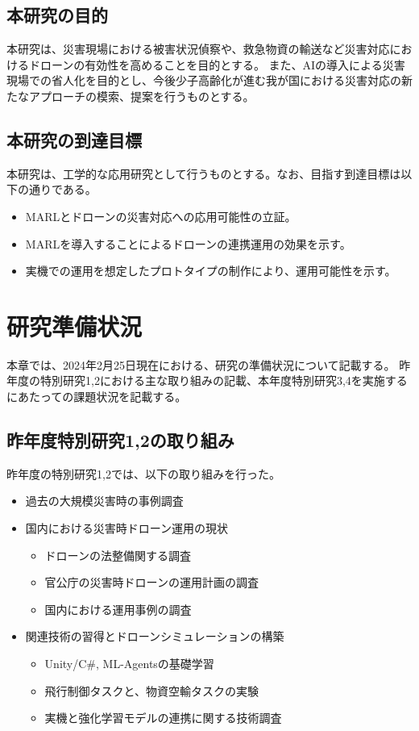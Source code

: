 \documentclass{article}[jsarticle]
\begin{document}
\subsection{本研究の目的}
本研究は、災害現場における被害状況偵察や、救急物資の輸送など災害対応におけるドローンの有効性を高めることを目的とする。
また、AIの導入による災害現場での省人化を目的とし、今後少子高齢化が進む我が国における災害対応の新たなアプローチの模索、提案を行うものとする。
\subsection{本研究の到達目標}
本研究は、工学的な応用研究として行うものとする。なお、目指す到達目標は以下の通りである。
\begin{itemize}
    \item MARLとドローンの災害対応への応用可能性の立証。
    \item MARLを導入することによるドローンの連携運用の効果を示す。
    \item 実機での運用を想定したプロトタイプの制作により、運用可能性を示す。
\end{itemize}

\section{研究準備状況}
本章では、2024年2月25日現在における、研究の準備状況について記載する。
昨年度の特別研究1,2における主な取り組みの記載、本年度特別研究3,4を実施するにあたっての課題状況を記載する。
\subsection{昨年度特別研究1,2の取り組み}
昨年度の特別研究1,2では、以下の取り組みを行った。
\begin{itemize}
    \item 過去の大規模災害時の事例調査
    \item 国内における災害時ドローン運用の現状
    \begin{itemize}
        \item ドローンの法整備関する調査
        \item 官公庁の災害時ドローンの運用計画の調査
        \item 国内における運用事例の調査
    \end{itemize}
    \item 関連技術の習得とドローンシミュレーションの構築
    \begin{itemize}
        \item Unity/C\#, ML-Agentsの基礎学習
        \item 飛行制御タスクと、物資空輸タスクの実験
        \item 実機と強化学習モデルの連携に関する技術調査
    \end{itemize}
\end{itemize}
\end{document}
